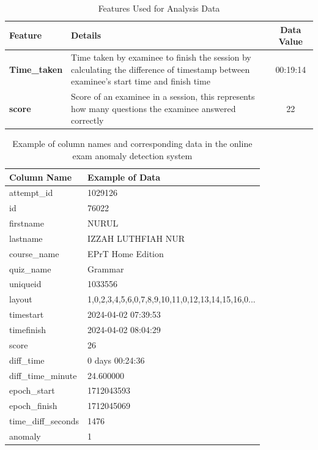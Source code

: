 \begin{table}[H]
	\centering
	\caption{Features Used for Analysis Data}
	\begin{tabular}{|l|p{10cm}|c|}
		\hline
		\textbf{Feature} & \textbf{Details} & \textbf{Data Value} \\
		\hline
		\textbf{Time\_taken} & Time taken by examinee to finish the session by calculating the difference of timestamp between examinee’s start time and finish time & 00:19:14 \\
		\hline
		\textbf{score} & Score of an examinee in a session, this represents how many questions the examinee answered correctly & 22 \\
		\hline
	\end{tabular}
\end{table}

\begin{table}[H]
	\centering
	\renewcommand{\arraystretch}{1.3}
	\begin{tabular}{|p{4cm}|p{10cm}|}
		\hline
		\textbf{Column Name} & \textbf{Example of Data} \\
		\hline
		attempt\_id & 1029126 \\
		\hline
		id & 76022 \\
		\hline
		firstname & NURUL \\
		\hline
		lastname & IZZAH LUTHFIAH NUR \\
		\hline
		course\_name & EPrT Home Edition \\
		\hline
		quiz\_name & Grammar \\
		\hline
		uniqueid & 1033556 \\
		\hline
		layout & 1,0,2,3,4,5,6,0,7,8,9,10,11,0,12,13,14,15,16,0... \\
		\hline
		timestart & 2024-04-02 07:39:53 \\
		\hline
		timefinish & 2024-04-02 08:04:29 \\
		\hline
		score & 26 \\
		\hline
		diff\_time & 0 days 00:24:36 \\
		\hline
		diff\_time\_minute & 24.600000 \\
		\hline
		epoch\_start & 1712043593 \\
		\hline
		epoch\_finish & 1712045069 \\
		\hline
		time\_diff\_seconds & 1476 \\
		\hline
		anomaly & 1 \\
		\hline
	\end{tabular}
	\caption{Example of column names and corresponding data in the online exam anomaly detection system}
	\label{tab:anomaly_data}
\end{table}


